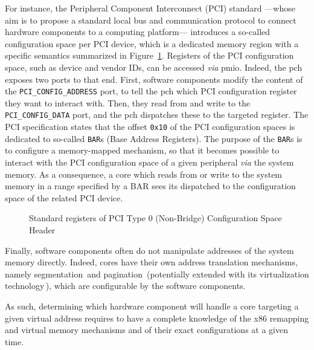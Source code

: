 For instance, the Peripheral Component Interconnect (PCI) standard ---whose aim
is to propose a standard local bus and communication protocol to connect
hardware components to a computing platform--- introduces a so-called
configuration space per PCI device, which is a dedicated memory region with a
specific semantics summarized in Figure~\ref{fig:usecase:pciconfig}.
%
Registers of the PCI configuration space, such as device and vendor IDs, can be
accessed \emph{via} \ac{pmio}.
%
Indeed, the \ac{pch} exposes two ports to that end.
%
First, software components modify the content of the
\texttt{PCI\_CONFIG\_ADDRESS} port, to tell the \ac{pch} which PCI configuration
register they want to interact with.
%
Then, they read from and write to the \texttt{PCI\_CONFIG\_DATA} port, and the
\ac{pch} dispatches these \IO to the targeted register.
%
The PCI specification states that the offset \texttt{0x10} of the PCI
configuration spaces is dedicated to so-called \texttt{BAR}s (Base Address
Registers).
%
The purpose of the \texttt{BAR}s is to configure a memory-mapped mechanism, so
that it becomes possible to interact with the PCI configuration space of a given
peripheral \emph{via} the system memory.
%
As a consequence, a core which reads from or write to the system memory in a
range specified by a BAR sees its \IO dispatched to the configuration space of
the related PCI device.

\begin{figure}
  \begin{center}
    \def\svgwidth{0.8\textwidth} \resizebox{0.6\textwidth}{!}{%
      }
  \end{center}
  \caption{Standard registers of PCI Type 0 (Non-Bridge) Configuration Space
    Header}
  \label{fig:usecase:pciconfig}
\end{figure}

Finally, software components often do not manipulate addresses of the system
memory directly.
%
Indeed, cores have their own address translation mechanisms, namely
segmentation\,\cite[Volume 3, Section 2.4]{intel2014manual} and
pagination\,\cite[Volume 3, Chapter 4]{intel2014manual} (potentially extended
with its virtualization technology\,\cite[Volume 3, Section
28.2]{intel2014manual}), which are configurable by the software components.

As such, determining which hardware component will handle a core \IO targeting a
given virtual address requires to have a complete knowledge of the x86 remapping
and virtual memory mechanisms and of their exact configurations at a given time.

